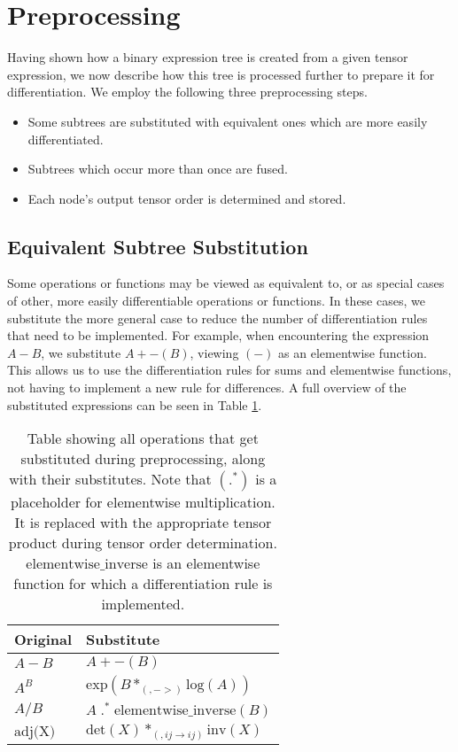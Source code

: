 \documentclass[12pt, a4paper]{report}
\begin{document}
\FloatBarrier
\section{Preprocessing}
Having shown how a binary expression tree is created from a given tensor expression, we now describe how this tree is processed further to prepare it for differentiation.
We employ the following three preprocessing steps.
\begin{itemize}
    \item Some subtrees are substituted with equivalent ones which are more easily differentiated.
    \item Subtrees which occur more than once are fused.
    \item Each node's output tensor order is determined and stored.
\end{itemize}

\subsection{Equivalent Subtree Substitution}
Some operations or functions may be viewed as equivalent to, or as special cases of other, more easily differentiable operations or functions.
In these cases, we substitute the more general case to reduce the number of differentiation rules that need to be implemented.
For example, when encountering the expression $A - B$, we substitute $A + -(B)$, viewing $(-)$ as an elementwise function.
This allows us to use the differentiation rules for sums and elementwise functions, not having to implement a new rule for differences.
A full overview of the substituted expressions can be seen in Table \ref{tab:substitutions}.
\begin{table}[ht]
    \centering
    \begin{tabular}{l | l}
        Original & Substitute \\\hline
        $A-B$ & $A + -(B)$ \\
        $A^B$ & $\text{exp}(B *_{(,->)} \text{log}(A))$ \\ %
        $A/B$ & $A \;.^*\; \text{elementwise\_inverse}(B)$ \\
        $\text{adj(X)}$ & $\text{det}(X) *_{(,ij \rightarrow ij)} \text{inv}(X)$ \\ 
    \end{tabular}
    \caption{Table showing all operations that get substituted during preprocessing, along with their substitutes. Note that $(.^*)$ is a placeholder for elementwise multiplication. It is replaced with the appropriate tensor product during tensor order determination. $\text{elementwise\_inverse}$ is an elementwise function for which a differentiation rule is implemented.}
    \label{tab:substitutions}
\end{table}
\FloatBarrier
\end{document}
